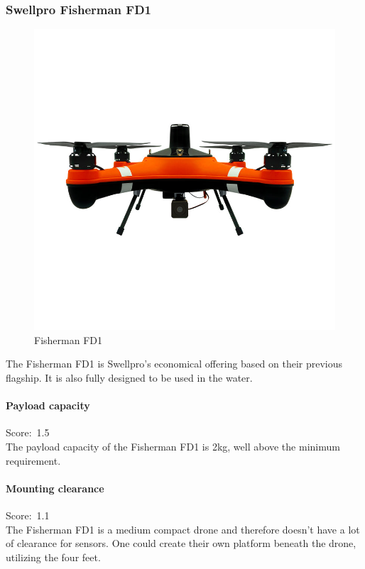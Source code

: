 \newpage
\subsubsection{Swellpro Fisherman FD1}
\begin{figure}
\includegraphics[width=1\linewidth]{uav/models/11_fishermanfd1.png}
\caption{Fisherman FD1}
\end{figure}
The Fisherman FD1 \cite{fishermanfd1} is Swellpro's economical offering based on their previous flagship. It is also fully designed to be used in the water.

\paragraph{Payload capacity}\mbox{Score: 1.5} \\
The payload capacity of the Fisherman FD1 is 2kg, well above the minimum requirement.

\paragraph{Mounting clearance}\mbox{Score: 1.1} \\
The Fisherman FD1 is a medium compact drone and therefore doesn't have a lot of clearance for sensors. One could create their own platform beneath the drone, utilizing the four feet.

